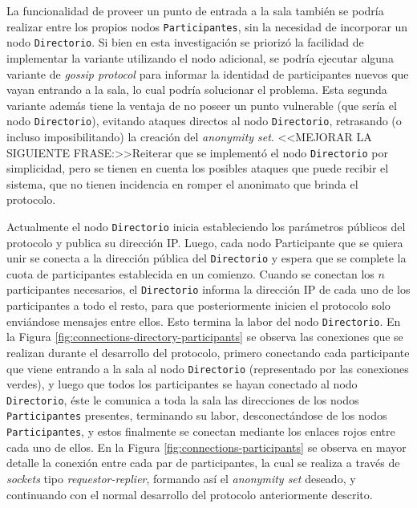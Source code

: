 La funcionalidad de proveer un punto de entrada a la sala también se podría 
realizar entre los propios nodos \texttt{Participantes}, sin la necesidad de 
incorporar un nodo \texttt{Directorio}. Si bien en esta investigación se 
priorizó la facilidad de implementar la variante utilizando el nodo adicional, 
se podría ejecutar alguna variante de \emph{gossip protocol} 
\cite{Demers:1987:EAR:41840.41841} para informar la identidad de participantes 
nuevos que vayan entrando a la sala, lo cual podría solucionar el problema. 
Esta segunda variante además tiene la ventaja de no poseer un punto vulnerable 
(que sería el nodo \texttt{Directorio}), evitando ataques directos al nodo 
\texttt{Directorio}, retrasando (o incluso imposibilitando) la 
creación del \emph{anonymity set}. 
<<MEJORAR LA SIGUIENTE FRASE:>>Reiterar que se implementó el nodo 
\texttt{Directorio} por simplicidad, pero se tienen en cuenta los posibles 
ataques que puede recibir el sistema, que no tienen incidencia en romper el 
anonimato que brinda el protocolo.

Actualmente el nodo \texttt{Directorio} inicia estableciendo los 
parámetros públicos del protocolo y publica su dirección IP. Luego, cada nodo 
Participante que se quiera unir se conecta a la dirección pública del 
\texttt{Directorio} y espera que se complete la cuota de participantes 
establecida en un comienzo. Cuando se conectan los $n$ participantes 
necesarios, el \texttt{Directorio} informa la dirección IP de cada uno de los 
participantes a todo el resto, para que posteriormente inicien el protocolo 
solo enviándose mensajes entre ellos. Esto termina la labor del nodo 
\texttt{Directorio}. En la Figura \ref{fig:connections-directory-participants} 
se observa las conexiones que se realizan durante el desarrollo del protocolo, 
primero conectando cada participante que viene entrando a la sala al nodo 
\texttt{Directorio} (representado por las conexiones verdes), y luego que 
todos los participantes se hayan conectado al nodo \texttt{Directorio}, éste 
le comunica a toda la sala las direcciones de los nodos \texttt{Participantes} 
presentes, terminando su labor, desconectándose de los nodos 
\texttt{Participantes}, y estos finalmente se conectan mediante los enlaces 
rojos entre cada uno de ellos. En la Figura \ref{fig:connections-participants} 
se observa en mayor detalle la conexión entre cada par de participantes, la 
cual se realiza a través de \emph{sockets} tipo \emph{requestor-replier}, 
formando así el \emph{anonymity set} deseado, y continuando con el normal 
desarrollo del protocolo anteriormente descrito.

